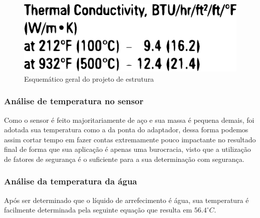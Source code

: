 \begin{figure}[!htb]                                                               
   \centering                                                                      
   \includegraphics[width=15cm, keepaspectratio=true]{figuras/Teste14_1.eps}
   \caption{Esquemático geral do projeto de estrutura}                        
\end{figure}

\subsubsection{Análise de temperatura no sensor}
Como o sensor é feito majoritariamente de aço e sua massa é pequena demais, foi adotada sua temperatura como a da ponta do adaptador, dessa forma podemos assim cortar tempo em fazer contas extremamente pouco impactante no resultado final de forma que sua aplicação é apenas uma burocracia, visto que a utilização de fatores de segurança é o suficiente para a sua determinação com segurança.

\subsubsection{Análise da temperatura da água}
Após ser determinado que o líquido de arrefecimento é água, sua temperatura é facilmente determinada pela seguinte equação que resulta em $56.4^{\circ}C$.

